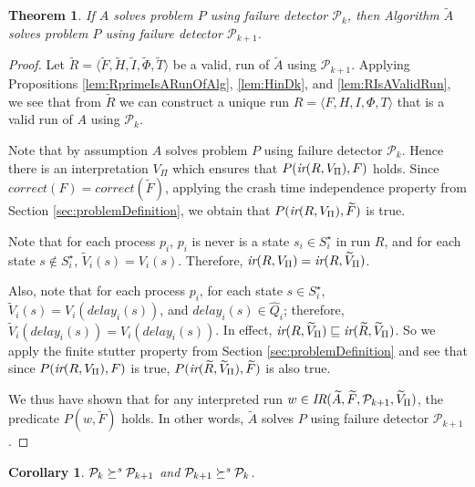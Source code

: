 \documentclass[11pt]{article}
\newtheorem{theorem}[proposition]{Theorem}
\newtheorem{corollary}[proposition]{Corollary}
\newcommand{\ident}[1]{\textit{#1}\rule{0cm}{1ex}}
\newcommand{\PFD}{\ensuremath{\mathcal{P}}}
\newcommand{\problem}{P} \newcommand{\Alg}{A}
\newcommand{\TrAlg}{\widetilde{A}}
\newcommand{\redSolv}{\succeq^{\ident{s}}}
\begin{document}
\begin{theorem}
If $\Alg$ solves problem $\problem$ using failure detector $\PFD_{k}$,
     then Algorithm $\TrAlg$ solves problem $\problem$ using failure
     detector $\PFD_{k+1}$.
\end{theorem}
\begin{proof}
Let $\widetilde{R}=\langle \widetilde{F}, \widetilde{H}, \widetilde{I},
     \widetilde{\Phi}, \widetilde{T} \rangle$ be a
     valid, run of $\TrAlg$ using $\PFD_{k+1}$.
Applying Propositions \ref{lem:RprimeIsARunOfAlg}, \ref{lem:HinDk},
     and \ref{lem:RIsAValidRun}, we see that from $\widetilde{R}$ we
     can construct a unique run $R=\langle F, H, I, \Phi, T \rangle$
     that is a valid run of $\Alg$ using $\PFD_{k}$.

Note that by assumption $\Alg$ solves problem $\problem$ using failure
     detector $\PFD_k$.
Hence there is an interpretation $V_\Pi$ which ensures that
     $\problem(\ident{ir}(R,V_\Pi), F)$ holds.
Since $correct(F) = correct(\widetilde{F})$, applying the crash time independence
     property from Section \ref{sec:problemDefinition}, we obtain that
     $\problem(\ident{ir}(R,V_\Pi),\widetilde{F})$ is true.

Note that for each process $p_i$, $p_i$ is never is a state $s_i \in
     S^\star_i$ in run $R$, and for each state  $s \notin  S^\star_i$,
     $\widetilde{V}_i(s) = V_i(s)$.
Therefore, $\ident{ir}(R,V_\Pi) = \ident{ir}(R,\widetilde{V}_\Pi)$.

Also, note that for each process $p_i$, for each state $s \in
     S^\star_i$, $\widetilde{V}_i(s) = V_i(delay_{i}(s))$, and
     $delay_i(s) \in \hat{Q}_i$; therefore,
     $\widetilde{V}_i(delay_{i}(s)) = V_i(delay_{i}(s))$.
In effect, $\ident{ir}(R,\widetilde{V}_\Pi) \sqsubseteq
     \ident{ir}(\widetilde{R}, \widetilde{V}_\Pi)$.
So we apply the finite stutter property from  Section
     \ref{sec:problemDefinition} and see that since
     $\problem(\ident{ir}(R,V_\Pi), F)$ is true,
     $\problem(\ident{ir}(\widetilde{R}, \widetilde{V}_\Pi),
     \widetilde{F})$ is also true.

We thus have shown that for any interpreted run $w \in
     \ident{IR}(\TrAlg,\widetilde{F},\PFD_{k+1},\widetilde{V}_\Pi)$,
     the predicate $P(w,\widetilde{F})$ holds.
In other words,   $\TrAlg$ solves  $\problem$ using
     failure detector $\PFD_{k+1}$.
\end{proof}

\begin{corollary}
$\PFD_k \redSolv \PFD_{k+1}$ and $\PFD_{k+1} \redSolv \PFD_k$.
\end{corollary}
\end{document}

